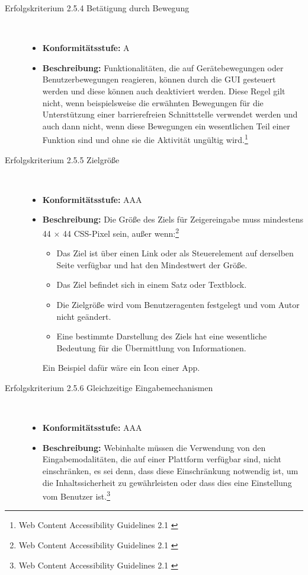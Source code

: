 \begin{description}
\begin{description}
		\item [Erfolgskriterium 2.5.4 Betätigung durch Bewegung]\hfill \\
		\begin{itemize}
			\item \textbf{Konformitätsstufe:} A
			\item \textbf{Beschreibung:} Funktionalitäten, die auf Gerätebewegungen oder Benutzerbewegungen reagieren, können durch die \ac{GUI} gesteuert werden und diese können auch 
			deaktiviert werden. Diese Regel gilt nicht, wenn beispielsweise die erwähnten Bewegungen für die Unterstützung einer barrierefreien Schnittstelle verwendet werden 
			und auch dann nicht, wenn diese Bewegungen ein wesentlichen Teil einer Funktion sind und ohne sie die Aktivität ungültig 
			wird.\footnote{Web Content Accessibility Guidelines 2.1 \cite{WCAG2.1}}
		\end{itemize}
		
		\item [Erfolgskriterium 2.5.5 Zielgröße]\hfill \\
		\begin{itemize}
			\item \textbf{Konformitätsstufe:} AAA
			\item \textbf{Beschreibung:} Die Größe des Ziels für Zeigereingabe muss mindestens 44 $\times$ 44 CSS-Pixel sein, außer 
			wenn:\footnote{Web Content Accessibility Guidelines 2.1 \cite{WCAG2.1}}
			\begin{itemize}
				\item Das Ziel ist über einen Link oder als Steuerelement auf derselben Seite verfügbar und hat den Mindestwert der Größe.
				\item Das Ziel befindet sich in einem Satz oder Textblock.
				\item Die Zielgröße wird vom Benutzeragenten festgelegt und vom Autor nicht geändert.
				\item Eine bestimmte Darstellung des Ziels hat eine wesentliche Bedeutung für die Übermittlung von Informationen.
			\end{itemize}
			
			Ein Beispiel dafür wäre ein Icon einer App.
		\end{itemize}
		
		\item [Erfolgskriterium 2.5.6 Gleichzeitige Eingabemechanismen]\hfill \\
		\begin{itemize}
			\item \textbf{Konformitätsstufe:} AAA
			\item \textbf{Beschreibung:} Webinhalte müssen die Verwendung von den Eingabemodalitäten, die auf einer Plattform verfügbar sind, nicht einschränken, es sei denn, dass 
			diese Einschränkung notwendig ist, um die Inhaltssicherheit zu gewährleisten oder dass dies eine Einstellung vom Benutzer 
			ist.\footnote{Web Content Accessibility Guidelines 2.1 \cite{WCAG2.1}}
		\end{itemize}
	\end{description}		


\end{description}
